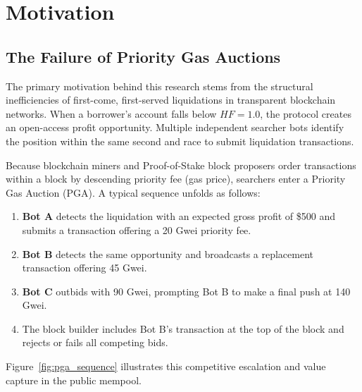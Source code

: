 \chapter{Motivation}
\label{chap:motivation}

\section{The Failure of Priority Gas Auctions}
The primary motivation behind this research stems from the structural inefficiencies of first-come, first-served liquidations in transparent blockchain networks. When a borrower's account falls below $HF = 1.0$, the protocol creates an open-access profit opportunity. Multiple independent searcher bots identify the position within the same second and race to submit liquidation transactions.

Because blockchain miners and Proof-of-Stake block proposers order transactions within a block by descending priority fee (gas price), searchers enter a Priority Gas Auction (PGA). A typical sequence unfolds as follows:
\begin{enumerate}
    \item \textbf{Bot A} detects the liquidation with an expected gross profit of \$500 and submits a transaction offering a 20 Gwei priority fee.
    \item \textbf{Bot B} detects the same opportunity and broadcasts a replacement transaction offering 45 Gwei.
    \item \textbf{Bot C} outbids with 90 Gwei, prompting Bot B to make a final push at 140 Gwei.
    \item The block builder includes Bot B's transaction at the top of the block and rejects or fails all competing bids.
\end{enumerate}

Figure~\ref{fig:pga_sequence} illustrates this competitive escalation and value capture in the public mempool.

